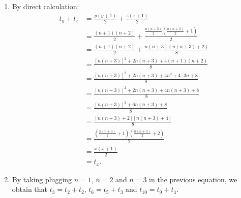 \begin{solution}
    \begin{enumerate}
        \item By direct calculation:
        \begin{align*}
            t_y + t_z &= \frac{y(y+1)}{2} + \frac{z(z+1)}{2} \\
            &= \frac{(n+1)(n+2)}{2} + \frac{ \displaystyle \frac{n(n+3)}{2} \left(\frac{n(n+3)}{2} + 1\right)}{2} \\
            &= \frac{(n+1)(n+2)}{2} + \frac{n(n+3)(n(n+3) + 2)}{8}\\
            &= \frac{[n(n+3)]^2 + 2n(n+3) + 4(n+1)(n+2)}{8} \\
            &= \frac{[n(n+3)]^2 + 2n(n+3) + 4n^2 + 4\cdot 3n + 8}{8} \\
            &= \frac{[n(n+3)]^2 + 2n(n+3) + 4n(n+3) + 8}{8} \\
            &= \frac{[n(n+3)]^2 + 6n(n+3) + 8}{8} \\
            &= \frac{[n(n+3) + 2][n(n+3) + 4]}{8} \\
            &= \frac{ \displaystyle \left(\frac{n(n+3)}{2} + 1\right)\left(\frac{n(n+3)}{2} + 2\right)}{2} \\
            &= \frac{x(x+1)}{2} \\
            &= t_x.
        \end{align*}
        \item By taking plugging $n = 1$, $n = 2$ and $n = 3$ in the previous equation, we obtain that $t_3 = t_2 + t_2$, $t_6 = t_5 + t_3$ and $t_{10} = t_9 + t_4$.
    \end{enumerate}
\end{solution}